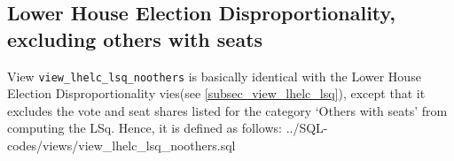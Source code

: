 \subsection{Lower House Election Disproportionality, excluding others with seats}\label{subsec_appx_view_lhelc_lsq_noothers}

View \texttt{view\_lhelc\_lsq\_noothers} is basically identical with 
the Lower House Election Disproportionality vies(see \ref{subsec_view_lhelc_lsq}), except that it excludes the vote and seat shares listed for the category `Others with seats' from computing the LSq. 
Hence, it is defined as  follows:
%
{../SQL-codes/views/view_lhelc_lsq_noothers.sql}